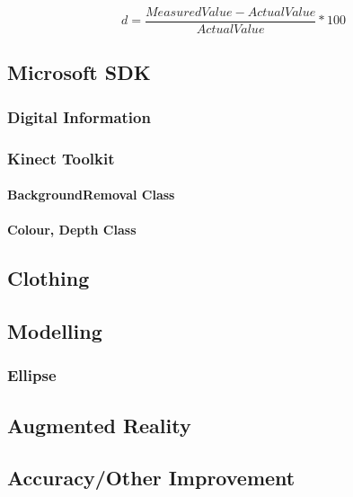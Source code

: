 \begin{equation} \label{eq: measurementAcc}
d = \frac{Measured Value - Actual Value}{Actual Value} * 100
\end{equation} 


\subsection{Microsoft SDK}

\subsubsection{Digital Information}

\subsubsection{Kinect Toolkit}

\paragraph{BackgroundRemoval Class}

\paragraph{Colour, Depth Class}


\subsection{Clothing}



\subsection{Modelling}

\subsubsection{Ellipse}




\subsection{Augmented Reality}


\subsection{Accuracy/Other Improvement }